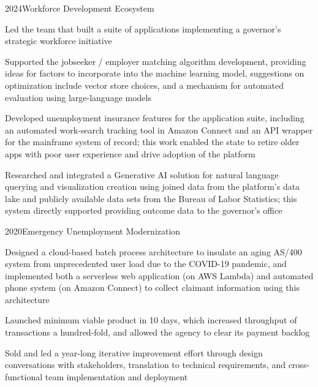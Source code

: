 \project
  {2024}{Workforce Development Ecosystem}
  {\begin{achievements}
    \item Led the team that built a suite of applications implementing a governor's strategic workforce initiative
    \item Supported the jobseeker / employer matching algorithm development, providing ideas for factors to incorporate into the machine learning model, suggestions on optimization include vector store choices, and a mechanism for automated evaluation using large-language models
    \item Developed unemployment insurance features for the application suite, including an automated work-search tracking tool in Amazon Connect and an API wrapper for the mainframe system of record; this work enabled the state to retire older apps with poor user experience and drive adoption of the platform
    \item Researched and integrated a Generative AI solution for natural language querying and visualization creation using joined data from the platform's data lake and publicly available data sets from the Bureau of Labor Statistics; this system directly supported providing outcome data to the governor's office
  \end{achievements}}

\project
  {2020}{Emergency Unemployment Modernization}
  {\begin{achievements}
    \item Designed a cloud-based batch process architecture to insulate an aging AS/400 system from unprecedented user load due to the COVID-19 pandemic, and implemented both a serverless web application (on AWS Lambda) and automated phone system (on Amazon Connect) to collect claimant information using this architecture
    \item Launched minimum viable product in 10 days, which increased throughput of transactions a hundred-fold, and allowed the agency to clear its payment backlog
    \item Sold and led a year-long iterative improvement effort through design conversations with stakeholders, translation to technical requirements, and cross-functional team implementation and deployment
  \end{achievements}}


